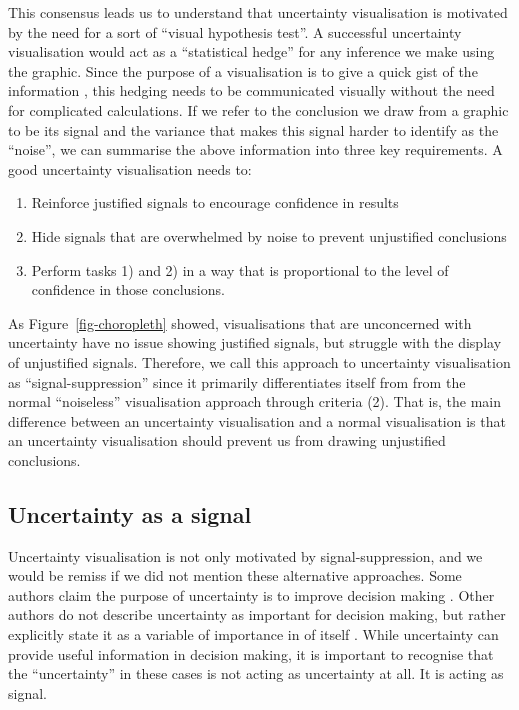 \documentclass[
  12pt]{article}
\providecommand{\tightlist}{%
  \setlength{\itemsep}{0pt}\setlength{\parskip}{0pt}}\usepackage{longtable,booktabs,array}
\begin{document}
This consensus leads us to understand that uncertainty visualisation is
motivated by the need for a sort of ``visual hypothesis test''. A
successful uncertainty visualisation would act as a ``statistical
hedge'' for any inference we make using the graphic. Since the purpose
of a visualisation is to give a quick gist of the information
\citep{Spiegelhalter2017}, this hedging needs to be communicated
visually without the need for complicated calculations. If we refer to
the conclusion we draw from a graphic to be its signal and the variance
that makes this signal harder to identify as the ``noise'', we can
summarise the above information into three key requirements. A good
uncertainty visualisation needs to:

\begin{enumerate}
\def\labelenumi{\arabic{enumi})}
\tightlist
\item
  Reinforce justified signals to encourage confidence in results
\item
  Hide signals that are overwhelmed by noise to prevent unjustified
  conclusions
\item
  Perform tasks 1) and 2) in a way that is proportional to the level of
  confidence in those conclusions.
\end{enumerate}

As Figure~\ref{fig-choropleth} showed, visualisations that are
unconcerned with uncertainty have no issue showing justified signals,
but struggle with the display of unjustified signals. Therefore, we call
this approach to uncertainty visualisation as ``signal-suppression''
since it primarily differentiates itself from from the normal
``noiseless'' visualisation approach through criteria (2). That is, the
main difference between an uncertainty visualisation and a normal
visualisation is that an uncertainty visualisation should prevent us
from drawing unjustified conclusions.

\subsection{Uncertainty as a signal}\label{uncertainty-as-a-signal}

Uncertainty visualisation is not only motivated by signal-suppression,
and we would be remiss if we did not mention these alternative
approaches. Some authors claim the purpose of uncertainty is to improve
decision making
\citep{Ibrekk1987, uncertchap2022, Hullman2016, Cheong2016, Boone2018, Padilla2017}.
Other authors do not describe uncertainty as important for decision
making, but rather explicitly state it as a variable of importance in of
itself \citep{Blenkinsop2000}. While uncertainty can provide useful
information in decision making, it is important to recognise that the
``uncertainty'' in these cases is not acting as uncertainty at all. It
is acting as signal.
\end{document}
